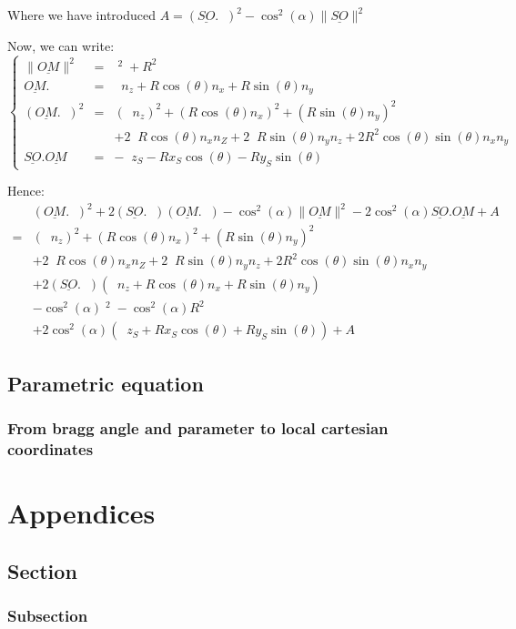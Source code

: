 \documentclass[a4paper,11pt,twoside,titlepage,openright]{book}
\numberwithin{equation}{section}
\newcommand{\ud}[1]{\underline{#1}}
\newcommand{\lt}{\left}
\newcommand{\rt}{\right}
\DeclareMathOperator{\n}{\underline{n}}
\DeclareMathOperator{\Z}{Z_C}
\begin{document}
Where we have introduced $A = \lt(\ud{SO}.\n\rt)^2 - \cos^2(\alpha)\|\ud{SO}\|^2$

Now, we can write:
$$
\lt\{
	\begin{array}{lll}
		\|\ud{OM}\|^2 & = & \Z^2 + R^2\\
		\ud{OM}.\n & = & \Z n_z + R\cos(\theta)n_x + R\sin(\theta)n_y\\
		\lt(\ud{OM}.\n\rt)^2 & = & \lt(\Z n_z\rt)^2 + \lt(R\cos(\theta)n_x\rt)^2 + \lt(R\sin(\theta)n_y\rt)^2\\
				     &&  + 2\Z R\cos(\theta)n_xn_Z + 2\Z R\sin(\theta)n_yn_z + 2R^2\cos(\theta)\sin(\theta)n_xn_y\\
		\ud{SO}.\ud{OM} & = & -\Z z_S - Rx_S\cos(\theta) - Ry_S\sin(\theta)
	\end{array}
\rt.
$$

Hence:
$$
\begin{array}{ll}
	& \lt(\ud{OM}.\n\rt)^2 + 2\lt(\ud{SO}.\n\rt)\lt(\ud{OM}.\n\rt)
	- \cos^2(\alpha)\|\ud{OM}\|^2 - 2\cos^2(\alpha)\ud{SO}.\ud{OM} + A\\
	= &
	\lt(\Z n_z\rt)^2 + \lt(R\cos(\theta)n_x\rt)^2 + \lt(R\sin(\theta)n_y\rt)^2\\
	& + 2\Z R\cos(\theta)n_xn_Z + 2\Z R\sin(\theta)n_yn_z + 2R^2\cos(\theta)\sin(\theta)n_xn_y\\
	& +2\lt(\ud{SO}.\n\rt)\lt(\Z n_z + R\cos(\theta)n_x + R\sin(\theta)n_y\rt)\\
	& - \cos^2(\alpha)\Z^2 - \cos^2(\alpha)R^2\\
	& + 2\cos^2(\alpha)\lt(\Z z_S + Rx_S\cos(\theta) + Ry_S\sin(\theta)\rt) + A
\end{array}
$$







\section{Parametric equation}

\subsection{From bragg angle and parameter to local cartesian coordinates}







\appendix
\chapter{Appendices}

\section{Section}
\subsection{Subsection}
\end{document}
